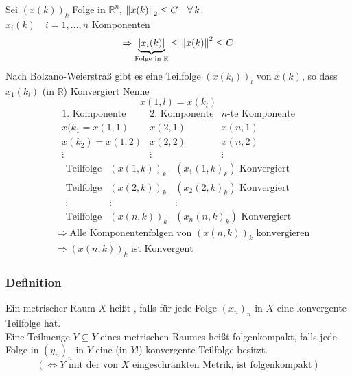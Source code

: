 Sei $(x(k))_k$ Folge in $\mathbb{R}^n$, $\norm{x(k)}_2 \leq C \quad  \forall\, k$. \\
$x_i(k) \quad  i=1,\dots,n$ Komponenten
\[
	\Rightarrow \underset{\text{Folge in } \mathbb{R}}{\underbrace{\abs{x_i(k)}}} \leq \norm{x(k)}^2 \leq C
\]
Nach Bolzano-Weierstraß gibt es eine Teilfolge $(x(k_l))_l$ von $x(k)$, so dass $x_1(k_l)$ (in $\mathbb{R}$) Konvergiert
Nenne \[
	x(1,l)=x(k_l)
\]
\[
\begin{matrix}
	\text{1. Komponente} & \text{2. Komponente} & \text{$n$-te Komponente} \\
	x(k_1=x(1,1) & x(2,1) & x(n,1) \\
	x(k_2)=x(1,2) & x(2,2) & x(n,2) \\
	\vdots & \vdots & \vdots 
\end{matrix}
\]
\[
	\begin{matrix}
		\text{Teilfolge} & (x(1,k))_k & (x_1(1,k)_k) \text{ Konvergiert} \\
		\text{Teilfolge} & (x(2,k))_k & (x_2(2,k)_k) \text{ Konvergiert} \\
		\vdots & \vdots & \vdots \\
		\text{Teilfolge} & (x(n,k))_k & (x_n(n,k)_k) \text{ Konvergiert}
	\end{matrix}
\]
\begin{align*}
	&\Rightarrow \text{Alle Komponentenfolgen von } (x(n,k))_k \text{ konvergieren} \\
	&\Rightarrow (x(n,k))_k \text{ ist Konvergent}
\end{align*}
\bewende
\subsubsection{Definition} %
\label{ssub:definition}
Ein metrischer Raum $X$ heißt , falls für jede Folge $(x_n)_n$ in $X$ eine konvergente Teilfolge hat. \\
Eine Teilmenge $Y \subseteq Y$ eines metrischen Raumes heißt folgenkompakt, falls jede Folge in $(y_n)_n$ in $Y$ eine (in $Y$!) konvergente Teilfolge besitzt.
\[
	( \Leftrightarrow Y \text{ mit der von $X$ eingeschränkten Metrik, ist folgenkompakt} )
\]
